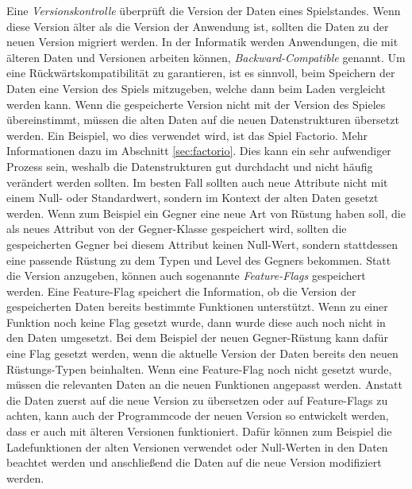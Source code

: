 Eine \textit{Versionskontrolle} überprüft die Version der Daten eines Spielstandes. Wenn diese Version älter als die Version der Anwendung ist, sollten die Daten zu der neuen Version migriert werden. In der Informatik werden Anwendungen, die mit älteren Daten und Versionen arbeiten können, \textit{Backward-Compatible} genannt.\cite{mediumEnsuringBackwards} Um eine Rückwärtskompatibilität zu garantieren, ist es sinnvoll, beim Speichern der Daten eine Version des Spiels mitzugeben, welche dann beim Laden vergleicht werden kann. Wenn die gespeicherte Version nicht mit der Version des Spieles übereinstimmt, müssen die alten Daten auf die neuen Datenstrukturen übersetzt werden. Ein Beispiel, wo dies verwendet wird, ist das Spiel Factorio. Mehr Informationen dazu im Abschnitt \ref{sec:factorio}. Dies kann ein sehr aufwendiger Prozess sein, weshalb die Datenstrukturen gut durchdacht und nicht häufig verändert werden sollten. Im besten Fall sollten auch neue Attribute nicht mit einem Null- oder Standardwert, sondern im Kontext der alten Daten gesetzt werden. Wenn zum Beispiel ein Gegner eine neue Art von Rüstung haben soll, die als neues Attribut von der Gegner-Klasse gespeichert wird, sollten die gespeicherten Gegner bei diesem Attribut keinen Null-Wert, sondern stattdessen eine passende Rüstung zu dem Typen und Level des Gegners bekommen. Statt die Version anzugeben, können auch sogenannte \textit{Feature-Flags} gespeichert werden. Eine Feature-Flag speichert die Information, ob die Version der gespeicherten Daten bereits bestimmte Funktionen unterstützt. Wenn zu einer Funktion noch keine Flag gesetzt wurde, dann wurde diese auch noch nicht in den Daten umgesetzt. Bei dem Beispiel der neuen Gegner-Rüstung kann dafür eine Flag gesetzt werden, wenn die aktuelle Version der Daten bereits den neuen Rüstungs-Typen beinhalten. Wenn eine Feature-Flag noch nicht gesetzt wurde, müssen die relevanten Daten an die neuen Funktionen angepasst werden. Anstatt die Daten zuerst auf die neue Version zu übersetzen oder auf Feature-Flags zu achten, kann auch der Programmcode der neuen Version so entwickelt werden, dass er auch mit älteren Versionen funktioniert. Dafür können zum Beispiel die Ladefunktionen der alten Versionen verwendet oder Null-Werten in den Daten beachtet werden und anschließend die Daten auf die neue Version modifiziert werden.\cite{mediumEnsuringBackwards} 

